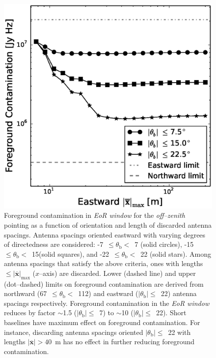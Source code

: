 \documentclass[preprint2,iop,numberedappendix]{emulateapj}
\begin{document}
\begin{figure}[htb]
\centering
\includegraphics[width=\linewidth]{figures/v1_0/baseline_screening_nside_64_Tsys_95.0K.eps}
\caption{Foreground contamination in {\it EoR window} for the {\it off--zenith} pointing as a function of orientation and length of discarded antenna spacings. Antenna spacings oriented eastward with varying degrees of directedness are considered: -7~$\le\theta_\textrm{b}<$~7 (solid circles), -15\arcdeg~$\le\theta_\textrm{b}<$~15\arcdeg (solid squares), and -22~$\le\theta_\textrm{b}<$~22 (solid stars). Among antenna spacings that satisfy the above criteria, ones with lengths $\le |\overline{\mathbf{x}}|_\textrm{max}$ ($x$--axis) are discarded. Lower (dashed line) and upper (dot--dashed) limits on foreground contamination are derived from northward (67~$\le\theta_\textrm{b}<$~112) and eastward ($|\theta_\textrm{b}|\le$~22) antenna spacings respectively. Foreground contamination in the {\it EoR window} reduces by factor $\sim$1.5 ($|\theta_\textrm{b}|\le$~7) to $\sim$10 ($|\theta_\textrm{b}|\le$~22). Short baselines have maximum effect on foreground contamination. For instance, discarding antenna spacings oriented $|\theta_\textrm{b}|\le$~22 with lengths $|\overline{\mathbf{x}}|>40$~m has no effect in further reducing foreground contamination. \label{fig:screening}}
\end{figure}
\end{document}
